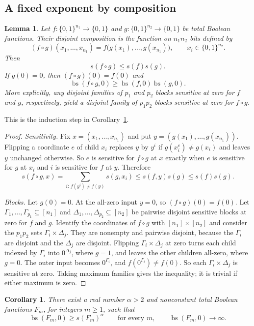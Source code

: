 \documentclass[11pt]{article}
\newcommand{\bs}{\operatorname{bs}}
\newtheorem{lemma}[theorem]{Lemma}
\newtheorem{corollary}[theorem]{Corollary}
\theoremstyle{definition}
\theoremstyle{remark}
\begin{document}
\subsection{A fixed exponent by composition}

\begin{lemma}
\label{lem:composition}
Let $f:\{0,1\}^{n_1}\to\{0,1\}$ and
$g:\{0,1\}^{n_2}\to\{0,1\}$ be total Boolean functions.
Their disjoint composition is the function on $n_1n_2$ bits defined by
\[
 (f\circ g)(x_1,\ldots,x_{n_1})
   =f\bigl(g(x_1),\ldots,g(x_{n_1})\bigr),
 \qquad x_i\in\{0,1\}^{n_2}.
\]
Then
\[
 s(f\circ g)\leq s(f)s(g).
\]
If $g(0)=0$, then $(f\circ g)(0)=f(0)$ and
\[
 \bs(f\circ g,0)\geq\bs(f,0)\bs(g,0).
\]
More explicitly, any disjoint families of $p_1$ and $p_2$ blocks sensitive at
zero for $f$ and $g$, respectively, yield a disjoint family of $p_1p_2$
blocks sensitive at zero for $f\circ g$.
\end{lemma}
This is the induction step in Corollary~\ref{cor:power-separation}.

\begin{proof}
\emph{Sensitivity.} Fix $x=(x_1,\ldots,x_{n_1})$ and put
$y=(g(x_1),\ldots,g(x_{n_1}))$. Flipping a coordinate $e$ of child $x_i$
replaces $y$ by $y^{i}$ if $g(x_i^e)\ne g(x_i)$ and leaves $y$ unchanged
otherwise. So $e$ is sensitive for $f\circ g$ at $x$ exactly when $e$ is
sensitive for $g$ at $x_i$ and $i$ is sensitive for $f$ at $y$. Therefore
\[
 s(f\circ g,x)
   =\sum_{i:\,f(y^{i})\ne f(y)}s(g,x_i)
   \leq s(f,y)s(g)
   \leq s(f)s(g).
\]

\emph{Blocks.} Let $g(0)=0$. At the all-zero input $y=0$, so
$(f\circ g)(0)=f(0)$. Let $\Gamma_1,\ldots,\Gamma_{p_1}\subseteq[n_1]$ and
$\Delta_1,\ldots,\Delta_{p_2}\subseteq[n_2]$ be pairwise disjoint sensitive
blocks at zero for $f$ and $g$. Identify the coordinates of $f\circ g$ with
$[n_1]\times[n_2]$ and consider the $p_1p_2$ sets $\Gamma_i\times\Delta_j$.
They are nonempty and pairwise disjoint, because the $\Gamma_i$ are disjoint
and the $\Delta_j$ are disjoint. Flipping $\Gamma_i\times\Delta_j$ at zero
turns each child indexed by $\Gamma_i$ into $0^{\Delta_j}$, where $g=1$, and
leaves the other children all-zero, where $g=0$. The outer input becomes
$0^{\Gamma_i}$, and $f(0^{\Gamma_i})\ne f(0)$. So each
$\Gamma_i\times\Delta_j$ is sensitive at zero. Taking maximum families gives
the inequality; it is trivial if either maximum is zero.
\end{proof}

\begin{corollary}
\label{cor:power-separation}
There exist a real number $\alpha>2$ and nonconstant total Boolean
functions $F_m$, for integers $m\geq1$, such that
\[
 \bs(F_m,0)\geq s(F_m)^\alpha
 \qquad\text{for every }m,
 \qquad
 \bs(F_m,0)\longrightarrow\infty.
\]
\end{corollary}
\end{document}
